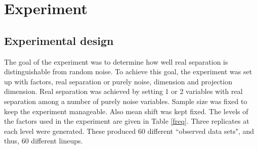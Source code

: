 %
%






\section{Experiment} \label{sec:experiment}

\subsection{Experimental design}


The goal of the experiment was to determine how well real separation is distinguishable from random noise. To achieve this goal, the experiment was set up with factors, real separation or purely noise, dimension and projection dimension. Real separation was achieved by setting 1 or 2 variables with real separation among a number of purely noise variables.  Sample size was fixed to keep the experiment manageable. Also mean shift was kept fixed. The levels of the factors used in the experiment are given in Table \ref{freq}. Three replicates at each level were generated. These produced 60 different ``observed data sets", and thus, 60 different lineups. 


